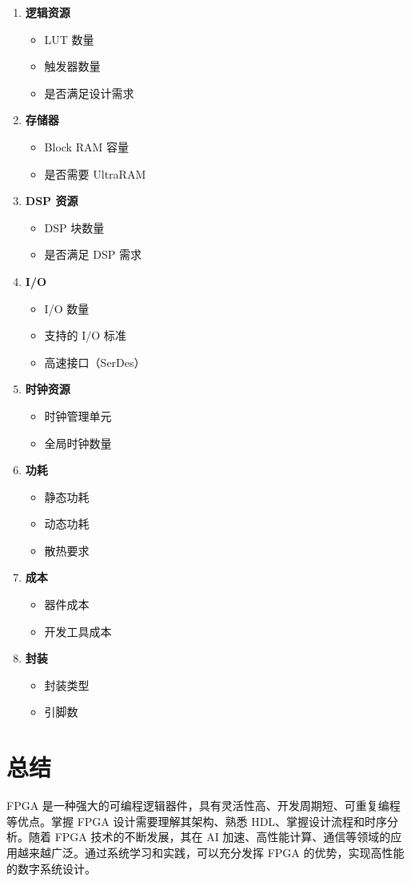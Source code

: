 \begin{enumerate}
  \item \textbf{逻辑资源}
    \begin{itemize}
      \item LUT 数量
      \item 触发器数量
      \item 是否满足设计需求
    \end{itemize}

  \item \textbf{存储器}
    \begin{itemize}
      \item Block RAM 容量
      \item 是否需要 UltraRAM
    \end{itemize}

  \item \textbf{DSP 资源}
    \begin{itemize}
      \item DSP 块数量
      \item 是否满足 DSP 需求
    \end{itemize}

  \item \textbf{I/O}
    \begin{itemize}
      \item I/O 数量
      \item 支持的 I/O 标准
      \item 高速接口（SerDes）
    \end{itemize}

  \item \textbf{时钟资源}
    \begin{itemize}
      \item 时钟管理单元
      \item 全局时钟数量
    \end{itemize}

  \item \textbf{功耗}
    \begin{itemize}
      \item 静态功耗
      \item 动态功耗
      \item 散热要求
    \end{itemize}

  \item \textbf{成本}
    \begin{itemize}
      \item 器件成本
      \item 开发工具成本
    \end{itemize}

  \item \textbf{封装}
    \begin{itemize}
      \item 封装类型
      \item 引脚数
    \end{itemize}
\end{enumerate}

\section{总结}

FPGA 是一种强大的可编程逻辑器件，具有灵活性高、开发周期短、可重复编程等优点。掌握 FPGA 设计需要理解其架构、熟悉 HDL、掌握设计流程和时序分析。随着 FPGA 技术的不断发展，其在 AI 加速、高性能计算、通信等领域的应用越来越广泛。通过系统学习和实践，可以充分发挥 FPGA 的优势，实现高性能的数字系统设计。
